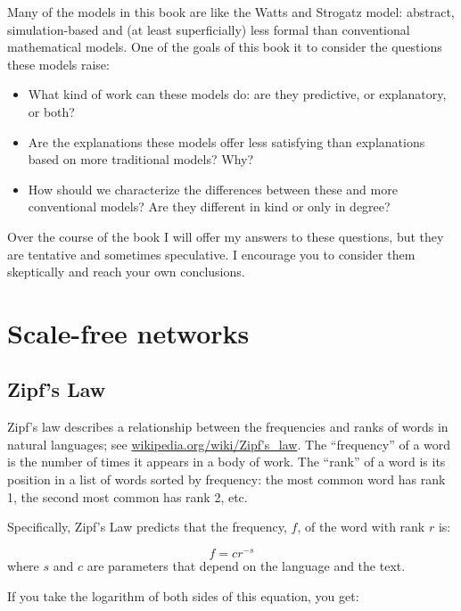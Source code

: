 \documentclass[10pt]{book}
\begin{document}
Many of the models in this book are like the Watts and
Strogatz model: abstract, simulation-based and (at least
superficially) less formal than conventional mathematical 
models.  One of the goals of this book it to consider the
questions these models raise:

\begin{itemize}

\item What kind of work can these models do: are they predictive, or
  explanatory, or both?

\item Are the explanations these models offer less satisfying than
  explanations based on more traditional models?  Why?

\item How should we characterize the differences between these and
  more conventional models?  Are they different in kind or only in
  degree?

\end{itemize}

Over the course of the book I will offer my answers
to these questions, but they are tentative and sometimes
speculative.  I encourage you to consider them skeptically
and reach your own conclusions.





\chapter{Scale-free networks}

\section{Zipf's Law}

Zipf's law describes a relationship between the frequencies and ranks
of words in natural languages; see
  \url{wikipedia.org/wiki/Zipf's_law}.  The ``frequency'' of
a word is the number of times it appears in a body of work.
The ``rank'' of a word is its position in a list of words
sorted by frequency: the most common word has rank 1, the
second most common has rank 2, etc.

Specifically, Zipf's Law
predicts that the frequency, $f$, of the word with rank $r$ is:

\[ f = c r^{-s} \]
%
where $s$ and $c$ are parameters that depend on the language and the
text.

If you take the logarithm of both sides of this equation, you get:
\end{document}
